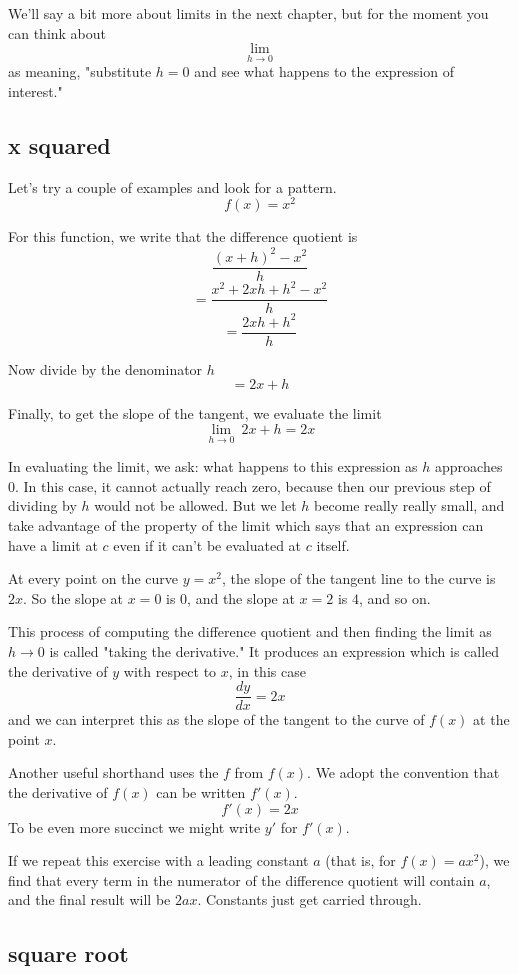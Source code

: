 \documentclass[11pt, oneside]{article}
\begin{document}
We'll say a bit more about limits in the next chapter, but for the moment you can think about 
\[  \lim_{h \to 0} \]
as meaning, "substitute $h=0$ and see what happens to the expression of interest."

\subsection*{x squared}

Let's try a couple of examples and look for a pattern.
\[    f(x)=x^2  \]

For this function, we write that the difference quotient is
\[    \frac{(x+h)^2 - x^2}{h} \]
\[    = \frac{x^2 + 2xh + h^2 - x^2}{h} \]
\[    = \frac{2xh + h^2}{h} \]

Now divide by the denominator $h$
\[    = 2x + h \]
    
Finally, to get the slope of the tangent, we evaluate the limit
\[    \lim_{h \to 0} \  2x + h = 2x \]

In evaluating the limit, we ask:  what happens to this expression as $h$ approaches $0$.  In this case, it cannot actually reach zero, because then our previous step of dividing by $h$ would not be allowed.  But we let $h$ become really really small, and take advantage of the property of the limit which says that an expression can have a limit at $c$ even if it can't be evaluated at $c$ itself.

At every point on the curve $y=x^2$, the slope of the tangent line to the curve is $2x$.  So the slope at $x=0$ is $0$, and the slope at $x=2$ is $4$, and so on.

This process of computing the difference quotient and then finding the limit as $h \to 0$ is called "taking the derivative."  It produces an expression which is called the derivative of $y$ with respect to $x$, in this case
\[   \frac{dy}{dx} = 2x \]
and we can interpret this as the slope of the tangent to the curve of $f(x)$ at the point $x$.

Another useful shorthand uses the $f$ from $f(x)$.  We adopt the convention that the derivative of $f(x)$ can be written $f'(x)$.
\[    f'(x) = 2x \]
To be even more succinct we might write $y'$ for $f'(x)$.

If we repeat this exercise with a leading constant $a$ (that is, for $f(x) = ax^2$), we find that every term in the numerator of the difference quotient will contain $a$, and the final result will be $2ax$.  Constants just get carried through.

\subsection*{square root}
\end{document}

